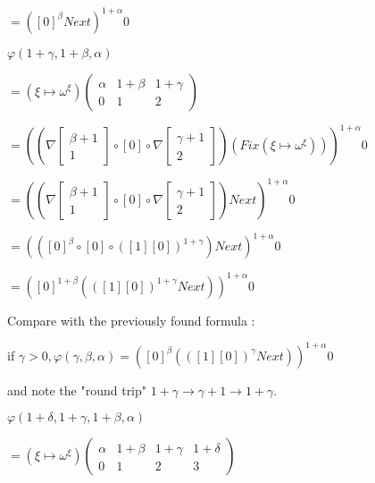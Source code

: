 \documentclass[10pt]{article}
\begin{document}
\( = ([0]^\beta Next)^{1+\alpha} 0 \)

\bigskip

\( \varphi(1+\gamma,1+\beta,\alpha) \)

\( = (\xi \mapsto \omega^\xi) \begin{pmatrix} \alpha & 1+\beta & 1+\gamma \\
                                              0      & 1       & 2        \end{pmatrix} \)

\( = ((\nabla \begin{bmatrix} \beta+1 \\
                              1       \end{bmatrix} \circ [0] \circ \nabla \begin{bmatrix} \gamma+1 \\
                                                                                           2        \end{bmatrix}) (Fix (\xi \mapsto \omega^\xi)))^{1+\alpha} 0 \)

\( = ((\nabla \begin{bmatrix} \beta+1 \\
                              1       \end{bmatrix} \circ [0] \circ \nabla \begin{bmatrix} \gamma+1 \\
                                                                                           2        \end{bmatrix}) Next)^{1+\alpha} 0 \)

\( = (([0]^\beta  \circ [0] \circ ([1] [0])^{1+\gamma}) Next)^{1+\alpha} 0 \)

\( = ([0]^{1+\beta} (([1] [0])^{1+\gamma} Next))^{1+\alpha} 0 \)

Compare with the previously found formula :

if \( \gamma > 0, \varphi(\gamma,\beta,\alpha) = ([0]^\beta (([1] [0])^\gamma Next))^{1+\alpha} 0 \)

and note the "round trip" \( 1+\gamma \rightarrow \gamma+1 \rightarrow 1+\gamma \).

\bigskip

\( \varphi(1+\delta,1+\gamma,1+\beta,\alpha) \)

\( = (\xi \mapsto \omega^\xi) \begin{pmatrix} \alpha & 1+\beta & 1+\gamma & 1+\delta \\
                                              0      & 1       & 2        & 3        \end{pmatrix} \)
\end{document}
